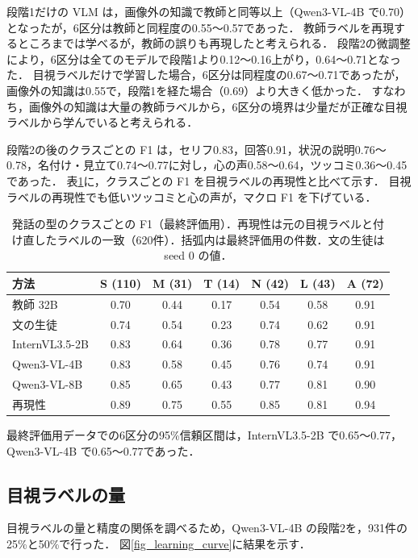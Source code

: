 段階1だけの VLM は，画像外の知識で教師と同等以上（Qwen3-VL-4B で0.70）となったが，6区分は教師と同程度の0.55〜0.57であった．
教師ラベルを再現するところまでは学べるが，教師の誤りも再現したと考えられる．
段階2の微調整により，6区分は全てのモデルで段階1より0.12〜0.16上がり，0.64〜0.71となった．
目視ラベルだけで学習した場合，6区分は同程度の0.67〜0.71であったが，画像外の知識は0.55で，段階1を経た場合（0.69）より大きく低かった．
すなわち，画像外の知識は大量の教師ラベルから，6区分の境界は少量だが正確な目視ラベルから学んでいると考えられる．

段階2の後のクラスごとの F1 は，セリフ0.83，回答0.91，状況の説明0.76〜0.78，名付け・見立て0.74〜0.77に対し，心の声0.58〜0.64，ツッコミ0.36〜0.45であった．
表\ref{tab_per_class}に，クラスごとの F1 を目視ラベルの再現性と比べて示す．
目視ラベルの再現性でも低いツッコミと心の声が，マクロ F1 を下げている．

\begin{table}[t]
    \centering
    \caption{発話の型のクラスごとの F1（最終評価用）．再現性は元の目視ラベルと付け直したラベルの一致（620件）．括弧内は最終評価用の件数．文の生徒は seed 0 の値．}
    \label{tab_per_class}
    \footnotesize
    \setlength{\tabcolsep}{2.5pt}
    \begin{tabular}{@{}lcccccc@{}}
        \toprule
        方法 & S (110) & M (31) & T (14) & N (42) & L (43) & A (72) \\
        \midrule
        教師 32B & 0.70 & 0.44 & 0.17 & 0.54 & 0.58 & 0.91 \\
        文の生徒 & 0.74 & 0.54 & 0.23 & 0.74 & 0.62 & 0.91 \\
        InternVL3.5-2B & 0.83 & 0.64 & 0.36 & 0.78 & 0.77 & 0.91 \\
        Qwen3-VL-4B & 0.83 & 0.58 & 0.45 & 0.76 & 0.74 & 0.91 \\
        Qwen3-VL-8B & 0.85 & 0.65 & 0.43 & 0.77 & 0.81 & 0.90 \\
        \midrule
        再現性 & 0.89 & 0.75 & 0.55 & 0.85 & 0.81 & 0.94 \\
        \bottomrule
    \end{tabular}
\end{table}
最終評価用データでの6区分の95\%信頼区間は，InternVL3.5-2B で0.65〜0.77，Qwen3-VL-4B で0.65〜0.77であった．

\subsection{目視ラベルの量}
目視ラベルの量と精度の関係を調べるため，Qwen3-VL-4B の段階2を，931件の25\%と50\%で行った．
図\ref{fig_learning_curve}に結果を示す．

